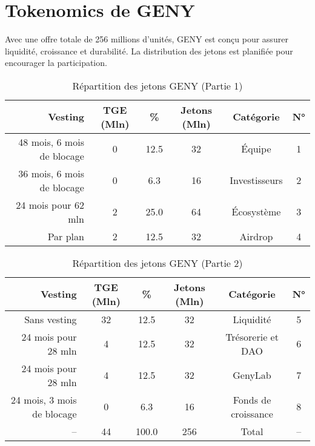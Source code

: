 \documentclass[a4paper,12pt,openany]{book}
\begin{document}
\section*{Tokenomics de GENY}
Avec une offre totale de 256 millions d'unités, GENY est conçu pour assurer liquidité, croissance et durabilité. La distribution des jetons est planifiée pour encourager la participation.

\begin{table}[h]
\centering
\caption{Répartition des jetons GENY (Partie 1)}
\small
\begin{tabular}{r c c c c c}
\hline
\textbf{Vesting} & \textbf{TGE (Mln)} & \textbf{\%} & \textbf{Jetons (Mln)} & \textbf{Catégorie} & \textbf{N°} \\
\hline
48 mois, 6 mois de blocage & 0 & 12.5 & 32 & Équipe & 1 \\
36 mois, 6 mois de blocage & 0 & 6.3 & 16 & Investisseurs & 2 \\
24 mois pour 62 mln & 2 & 25.0 & 64 & Écosystème & 3 \\
Par plan & 2 & 12.5 & 32 & Airdrop & 4 \\
\hline
\end{tabular}
\end{table}

\begin{table}[h]
\centering
\caption{Répartition des jetons GENY (Partie 2)}
\small
\begin{tabular}{r c c c c c}
\hline
\textbf{Vesting} & \textbf{TGE (Mln)} & \textbf{\%} & \textbf{Jetons (Mln)} & \textbf{Catégorie} & \textbf{N°} \\
\hline
Sans vesting & 32 & 12.5 & 32 & Liquidité & 5 \\
24 mois pour 28 mln & 4 & 12.5 & 32 & Trésorerie et DAO & 6 \\
24 mois pour 28 mln & 4 & 12.5 & 32 & GenyLab & 7 \\
24 mois, 3 mois de blocage & 0 & 6.3 & 16 & Fonds de croissance & 8 \\
\hline
-- & 44 & 100.0 & 256 & Total & -- \\
\hline
\end{tabular}
\end{table}
\end{document}
